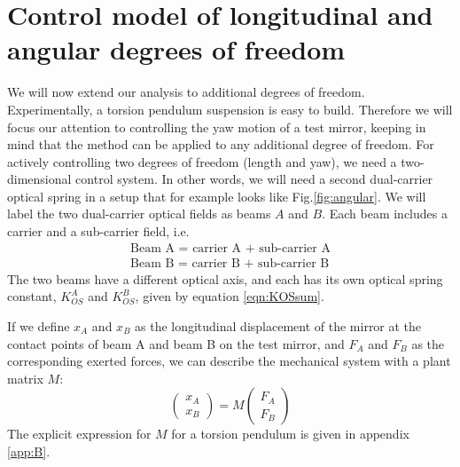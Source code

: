 \section{Control model of longitudinal and angular degrees of freedom}
\label{sec:III} 

We will now extend our analysis to additional degrees of freedom. Experimentally, a torsion pendulum suspension is  easy to build. Therefore we will focus our attention to controlling the yaw motion of a test mirror, keeping in mind that the method can be applied to any additional degree of freedom. For actively controlling two degrees of freedom (length and yaw), we need a two-dimensional control system. In other words, we will need a second dual-carrier optical spring in a setup that for example looks like Fig.\ref{fig:angular}. We will label the two dual-carrier optical fields as beams $A$ and $B$. Each beam includes a carrier and a sub-carrier field, i.e.
\begin{eqnarray}
\label{eqn:beams}
\mbox{Beam A = carrier A + sub-carrier A}\\ \nonumber
\mbox{Beam B = carrier B + sub-carrier B}\nonumber
\end{eqnarray}
The two beams have a different optical axis, and each has its own optical spring constant, $K_{OS}^A$ and $K_{OS}^B$, given by equation 
\ref{eqn:KOSsum}.

If we define $x_A$ and $x_B$ as the longitudinal displacement of the mirror at the contact points
of beam A and beam B on the test mirror,
 and $F_A$ and $F_B$ as the corresponding exerted forces, we can describe the mechanical system with a plant matrix $M$:
\begin{equation}
 \begin{pmatrix}
x_A\\ x_B
\end{pmatrix} 
=
M \begin{pmatrix}
F_{A}\\ F_{B}
\end{pmatrix}
\label{eq:MF}
\end{equation}
The explicit expression for $M$ for a torsion pendulum is given in appendix \ref{app:B}.

